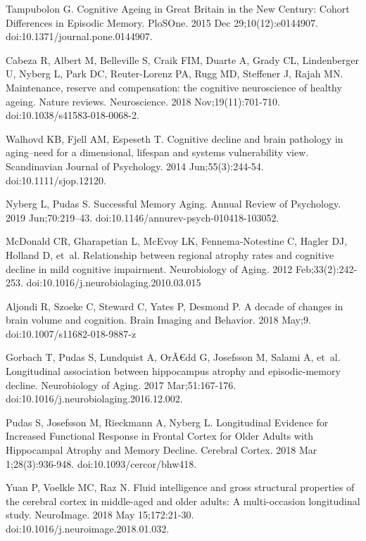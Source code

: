 \documentclass[10pt,letterpaper]{article}
\begin{document}
\begin{thebibliography}{10}
Tampubolon G.
\newblock Cognitive Ageing in Great Britain in the New Century: Cohort
  Differences in Episodic Memory.
\newblock PloSOne. 2015 Dec 29;10(12):e0144907. doi:10.1371/journal.pone.0144907.

 
Cabeza R, Albert M, Belleville S, Craik FIM, Duarte A, Grady CL, Lindenberger U, Nyberg L, Park DC, Reuter-Lorenz PA, Rugg MD, Steffener J, Rajah MN.
\newblock Maintenance, reserve and compensation: the cognitive neuroscience of healthy ageing.
\newblock Nature reviews. Neuroscience. 2018 Nov;19(11):701-710. doi:10.1038/s41583-018-0068-2.

Walhovd KB, Fjell AM, Espeseth T.
\newblock Cognitive decline and brain pathology in aging--need for a dimensional, lifespan and systems vulnerability view.
\newblock Scandinavian Journal of Psychology. 2014 Jun;55(3):244-54. doi:10.1111/sjop.12120.

Nyberg L, Pudas S.
\newblock Successful Memory Aging.
\newblock Annual Review of Psychology. 2019 Jun;70:219–43. doi:10.1146/annurev-psych-010418-103052.

McDonald CR, Gharapetian L, McEvoy LK, Fennema-Notestine C, Hagler DJ, Holland
  D, et~al.
\newblock Relationship between regional atrophy rates and cognitive decline in
  mild cognitive impairment.
\newblock Neurobiology of Aging. 2012 Feb;33(2):242-253. doi:10.1016/j.neurobiolaging.2010.03.015

Aljondi R, Szoeke C, Steward C, Yates P, Desmond P.
\newblock A decade of changes in brain volume and cognition.
\newblock Brain Imaging and Behavior. 2018 May;9. doi:10.1007/s11682-018-9887-z

Gorbach T, Pudas S, Lundquist A, OrÃ€dd G, Josefsson M, Salami A, et~al.
\newblock Longitudinal association between hippocampus atrophy and
  episodic-memory decline.
\newblock Neurobiology of Aging. 2017 Mar;51:167-176. doi:10.1016/j.neurobiolaging.2016.12.002.

Pudas S, Josefsson M, Rieckmann A, Nyberg L.
\newblock Longitudinal Evidence for Increased Functional Response in Frontal
  Cortex for Older Adults with Hippocampal Atrophy and Memory Decline.
\newblock Cerebral Cortex. 2018 Mar 1;28(3):936-948. doi:10.1093/cercor/bhw418.

Yuan P, Voelkle MC, Raz N.
\newblock Fluid intelligence and gross structural properties of the cerebral cortex in middle-aged and older adults: A multi-occasion longitudinal study.
\newblock NeuroImage. 2018 May 15;172:21-30. doi:10.1016/j.neuroimage.2018.01.032.


\end{thebibliography}
\end{document}
